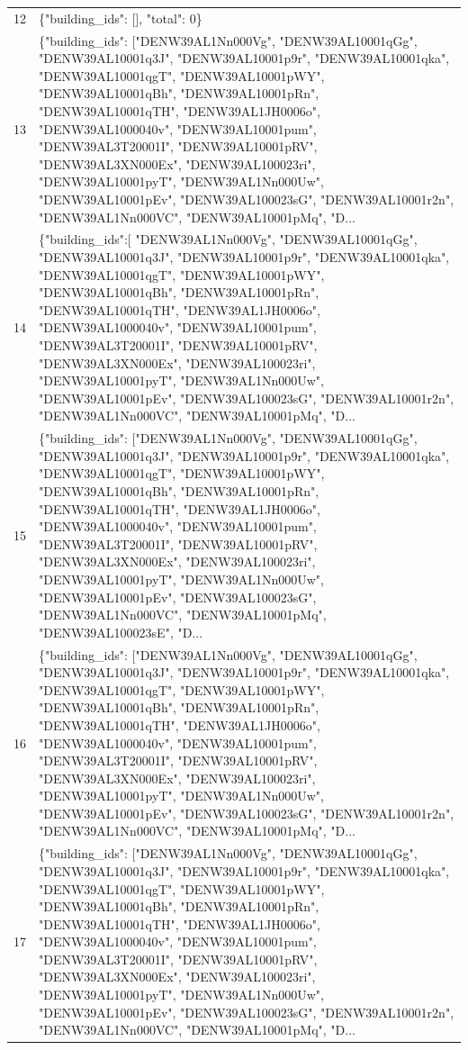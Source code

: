 \documentclass[a4paper,11pt]{article}
\begin{document}
\begin{table}[ht]
\begin{tabular}{r p{12cm}}
12 & \{"building\_ids": [], "total": 0\} \\
13 & \{"building\_ids": ["DENW39AL1Nn000Vg", "DENW39AL10001qGg", "DENW39AL10001q3J", "DENW39AL10001p9r", "DENW39AL10001qka", "DENW39AL10001qgT", "DENW39AL10001pWY", "DENW39AL10001qBh", "DENW39AL10001pRn", "DENW39AL10001qTH", "DENW39AL1JH0006o", "DENW39AL1000040v", "DENW39AL10001pum", "DENW39AL3T20001I", "DENW39AL10001pRV", "DENW39AL3XN000Ex", "DENW39AL100023ri", "DENW39AL10001pyT", "DENW39AL1Nn000Uw", "DENW39AL10001pEv", "DENW39AL100023sG", "DENW39AL10001r2n", "DENW39AL1Nn000VC", "DENW39AL10001pMq", "D... \\
14 & \{"building\_ids":[ "DENW39AL1Nn000Vg", "DENW39AL10001qGg", "DENW39AL10001q3J", "DENW39AL10001p9r", "DENW39AL10001qka", "DENW39AL10001qgT", "DENW39AL10001pWY", "DENW39AL10001qBh", "DENW39AL10001pRn", "DENW39AL10001qTH", "DENW39AL1JH0006o", "DENW39AL1000040v", "DENW39AL10001pum", "DENW39AL3T20001I", "DENW39AL10001pRV", "DENW39AL3XN000Ex", "DENW39AL100023ri", "DENW39AL10001pyT", "DENW39AL1Nn000Uw", "DENW39AL10001pEv", "DENW39AL100023sG", "DENW39AL10001r2n", "DENW39AL1Nn000VC", "DENW39AL10001pMq", "D... \\
15 & \{"building\_ids": ["DENW39AL1Nn000Vg", "DENW39AL10001qGg", "DENW39AL10001q3J", "DENW39AL10001p9r", "DENW39AL10001qka", "DENW39AL10001qgT", "DENW39AL10001pWY", "DENW39AL10001qBh", "DENW39AL10001pRn", "DENW39AL10001qTH", "DENW39AL1JH0006o", "DENW39AL1000040v", "DENW39AL10001pum", "DENW39AL3T20001I", "DENW39AL10001pRV", "DENW39AL3XN000Ex", "DENW39AL100023ri", "DENW39AL10001pyT", "DENW39AL1Nn000Uw", "DENW39AL10001pEv", "DENW39AL100023sG", "DENW39AL1Nn000VC", "DENW39AL10001pMq", "DENW39AL100023sE", "D... \\
16 & \{"building\_ids": ["DENW39AL1Nn000Vg", "DENW39AL10001qGg", "DENW39AL10001q3J", "DENW39AL10001p9r", "DENW39AL10001qka", "DENW39AL10001qgT", "DENW39AL10001pWY", "DENW39AL10001qBh", "DENW39AL10001pRn", "DENW39AL10001qTH", "DENW39AL1JH0006o", "DENW39AL1000040v", "DENW39AL10001pum", "DENW39AL3T20001I", "DENW39AL10001pRV", "DENW39AL3XN000Ex", "DENW39AL100023ri", "DENW39AL10001pyT", "DENW39AL1Nn000Uw", "DENW39AL10001pEv", "DENW39AL100023sG", "DENW39AL10001r2n", "DENW39AL1Nn000VC", "DENW39AL10001pMq", "D... \\
17 & \{"building\_ids": ["DENW39AL1Nn000Vg", "DENW39AL10001qGg", "DENW39AL10001q3J", "DENW39AL10001p9r", "DENW39AL10001qka", "DENW39AL10001qgT", "DENW39AL10001pWY", "DENW39AL10001qBh", "DENW39AL10001pRn", "DENW39AL10001qTH", "DENW39AL1JH0006o", "DENW39AL1000040v", "DENW39AL10001pum", "DENW39AL3T20001I", "DENW39AL10001pRV", "DENW39AL3XN000Ex", "DENW39AL100023ri", "DENW39AL10001pyT", "DENW39AL1Nn000Uw", "DENW39AL10001pEv", "DENW39AL100023sG", "DENW39AL10001r2n", "DENW39AL1Nn000VC", "DENW39AL10001pMq", "D... \\

\end{tabular}
\end{table}
\end{document}
